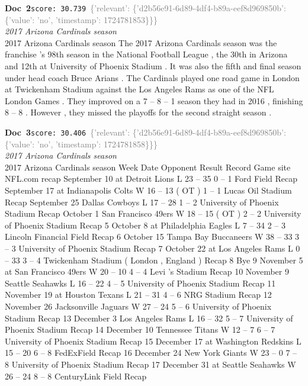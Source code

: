 \documentclass[a4paper,11pt]{article}
\begin{document}
\begin{docenv}
{\footnotesize\textcolor{doccolor}{\textbf{Doc~2}}}\hfill{\tiny\texttt{score:~30.739}}\ {\tiny\textcolor{gray}{\{'relevant': \{'d2b56e91-6d89-4df4-b89a-eef8d969850b': \{'value': 'no', 'timestamp': 1724781853\}\}\}}}\\[3pt]
{\small\textit{2017 Arizona Cardinals season}}\\[2pt]
\vspace{2pt}
{\footnotesize 2017 Arizona Cardinals season
The 2017 Arizona Cardinals season was the franchise 's 98th season in the National Football League , the 30th in Arizona and 12th at University of Phoenix Stadium . It was also the fifth and final season under head coach Bruce Arians . The Cardinals played one road game in London at Twickenham Stadium against the Los Angeles Rams as one of the NFL London Games . They improved on a 7 -- 8 -- 1 season they had in 2016 , finishing 8 -- 8 . However , they missed the playoffs for the second straight season .}
\end{docenv}
\begin{docenv}
{\footnotesize\textcolor{doccolor}{\textbf{Doc~3}}}\hfill{\tiny\texttt{score:~30.406}}\ {\tiny\textcolor{gray}{\{'relevant': \{'d2b56e91-6d89-4df4-b89a-eef8d969850b': \{'value': 'no', 'timestamp': 1724781858\}\}\}}}\\[3pt]
{\small\textit{2017 Arizona Cardinals season}}\\[2pt]
\vspace{2pt}
{\footnotesize 2017 Arizona Cardinals season
Week Date Opponent Result Record Game site NFL.com recap September 10 at Detroit Lions L 23 -- 35 0 -- 1 Ford Field Recap September 17 at Indianapolis Colts W 16 -- 13 ( OT ) 1 -- 1 Lucas Oil Stadium Recap September 25 Dallas Cowboys L 17 -- 28 1 -- 2 University of Phoenix Stadium Recap October 1 San Francisco 49ers W 18 -- 15 ( OT ) 2 -- 2 University of Phoenix Stadium Recap 5 October 8 at Philadelphia Eagles L 7 -- 34 2 -- 3 Lincoln Financial Field Recap 6 October 15 Tampa Bay Buccaneers W 38 -- 33 3 -- 3 University of Phoenix Stadium Recap 7 October 22 at Los Angeles Rams L 0 -- 33 3 -- 4 Twickenham Stadium ( London , England ) Recap 8 Bye 9 November 5 at San Francisco 49ers W 20 -- 10 4 -- 4 Levi 's Stadium Recap 10 November 9 Seattle Seahawks L 16 -- 22 4 -- 5 University of Phoenix Stadium Recap 11 November 19 at Houston Texans L 21 -- 31 4 -- 6 NRG Stadium Recap 12 November 26 Jacksonville Jaguars W 27 -- 24 5 -- 6 University of Phoenix Stadium Recap 13 December 3 Los Angeles Rams L 16 -- 32 5 -- 7 University of Phoenix Stadium Recap 14 December 10 Tennessee Titans W 12 -- 7 6 -- 7 University of Phoenix Stadium Recap 15 December 17 at Washington Redskins L 15 -- 20 6 -- 8 FedExField Recap 16 December 24 New York Giants W 23 -- 0 7 -- 8 University of Phoenix Stadium Recap 17 December 31 at Seattle Seahawks W 26 -- 24 8 -- 8 CenturyLink Field Recap}
\end{docenv}
\end{document}
